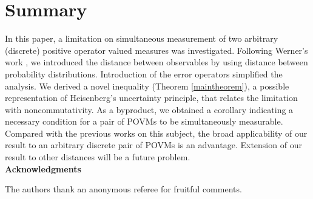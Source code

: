 \documentclass[showpacs,preprintnumbers,amsmath,amssymb]{revtex4}
\begin{document}
\section{Summary}
In this paper, 
a limitation on simultaneous 
measurement of two arbitrary (discrete) 
positive operator valued measures
was investigated. 
Following Werner's work \cite{Werner}, 
we introduced the distance between observables
 by using 
distance between probability distributions. 
Introduction of the error operators simplified
the analysis.
We derived a novel inequality (Theorem \ref{maintheorem}), a possible 
representation of Heisenberg's uncertainty 
principle, that relates the limitation with 
noncommutativity. 
As a byproduct, we obtained a 
corollary indicating a necessary condition for 
a pair of POVMs to be simultaneously measurable.
Compared with the previous works on this subject, 
the broad applicability of our result to an arbitrary
discrete pair of POVMs is an advantage.
Extension of our result to other distances will be a future problem. 
\\
{\bf Acknowledgments}
\par
The authors thank an anonymous referee for fruitful comments. 
\end{document}
